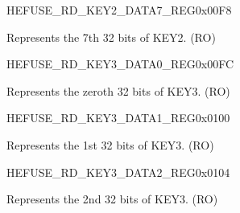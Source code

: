 \begin{register}{H}{EFUSE\_RD\_KEY2\_DATA7\_REG}{0x00F8}\label{regdesc:EFUSERDKEY2DATA7REG}
%
\regnewline%
\begin{regdesc}\begin{reglist}
\label{fielddesc:EFUSEKEY2DATA7}\item [EFUSE\_KEY2\_DATA7] Represents the 7th 32 bits of KEY2. (RO)
\end{reglist}\end{regdesc}
\end{register}


\begin{register}{H}{EFUSE\_RD\_KEY3\_DATA0\_REG}{0x00FC}\label{regdesc:EFUSERDKEY3DATA0REG}
%
\regnewline%
\begin{regdesc}\begin{reglist}
\label{fielddesc:EFUSEKEY3DATA0}\item [EFUSE\_KEY3\_DATA0] Represents the zeroth 32 bits of KEY3. (RO)
\end{reglist}\end{regdesc}
\end{register}


\begin{register}{H}{EFUSE\_RD\_KEY3\_DATA1\_REG}{0x0100}\label{regdesc:EFUSERDKEY3DATA1REG}
%
\regnewline%
\begin{regdesc}\begin{reglist}
\label{fielddesc:EFUSEKEY3DATA1}\item [EFUSE\_KEY3\_DATA1] Represents the 1st 32 bits of KEY3. (RO)
\end{reglist}\end{regdesc}
\end{register}


\begin{register}{H}{EFUSE\_RD\_KEY3\_DATA2\_REG}{0x0104}\label{regdesc:EFUSERDKEY3DATA2REG}
%
\regnewline%
\begin{regdesc}\begin{reglist}
\label{fielddesc:EFUSEKEY3DATA2}\item [EFUSE\_KEY3\_DATA2] Represents the 2nd 32 bits of KEY3. (RO)
\end{reglist}\end{regdesc}
\end{register}


